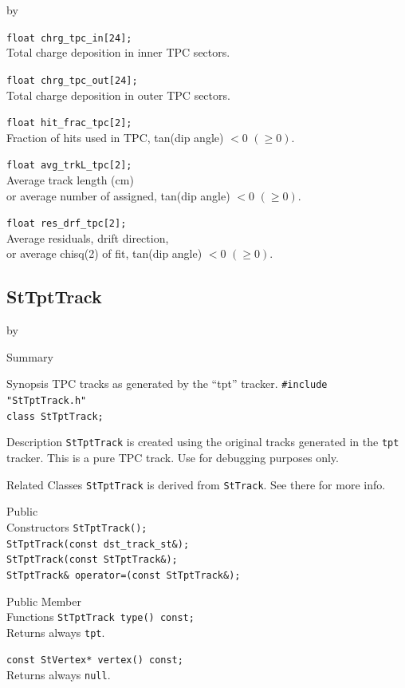 \documentclass[twoside]{article}
\newcommand{\entrylabel}[1]{\mbox{\textbf{{#1}}}\hfil}%
\newenvironment{entry}
{\begin{list}{}%
    {\renewcommand{\makelabel}{\entrylabel}%
     \setlength{\labelwidth}{90pt}%
     \setlength{\leftmargin}{\labelwidth}
     \advance\leftmargin by \labelsep%
      }%
    }%
  {\end{list}}
\newcommand{\Entrylabel}[1]%
{\raisebox{0pt}[1ex][0pt]{\makebox[\labelwidth][l]%
    {\parbox[t]{\labelwidth}{\hspace{0pt}\textbf{{#1}}}}}}
\newenvironment{Entry}%
{\renewcommand{\entrylabel}{\Entrylabel}\begin{entry}}%
  {\end{entry}}
\begin{document}
\begin{Entry}
    \verb+float chrg_tpc_in[24];+\\
    Total charge deposition in inner TPC sectors.
    
    \verb+float chrg_tpc_out[24];+\\
    Total charge deposition in outer TPC sectors.
    
    \verb+float hit_frac_tpc[2];+\\
    Fraction of hits used in TPC, tan(dip angle) $< 0$ $(\ge 0)$.
    
    \verb+float avg_trkL_tpc[2];+\\
    Average track length (cm) \\ or average number of assigned,
    tan(dip angle) $< 0$ $(\ge 0)$.
    
    \verb+float res_drf_tpc[2];+\\
    Average residuals, drift direction, \\ or average chisq(2) of fit,
    tan(dip angle) $< 0$ $(\ge 0)$.
\end{Entry}
\clearpage

\subsection{StTptTrack}
\label{sec:StTptTrack}
\begin{Entry}
\item[Summary]
\item[Synopsis] TPC tracks as generated by the ``tpt'' tracker.
    \verb+#include "StTptTrack.h"+\\
    \verb+class StTptTrack;+\\
\item[Description] \texttt{StTptTrack} is created using the original
     tracks generated in the \texttt{tpt} tracker. This is a pure TPC track.
     Use for debugging purposes only.

\item[Related Classes] \texttt{StTptTrack} is derived from
    \texttt{StTrack}. See there for more info.
    
\item[Public\\ Constructors]
    \verb+StTptTrack();+\\
    \verb+StTptTrack(const dst_track_st&);+\\
    \verb+StTptTrack(const StTptTrack&);+\\
    \verb+StTptTrack& operator=(const StTptTrack&);+\\
\item[Public Member\\ Functions]
    \verb+StTptTrack type() const;+\\
    Returns always \texttt{tpt}.

    \verb+const StVertex* vertex() const;+\\
    Returns always \texttt{null}.
\end{Entry}
\clearpage
\end{document}
